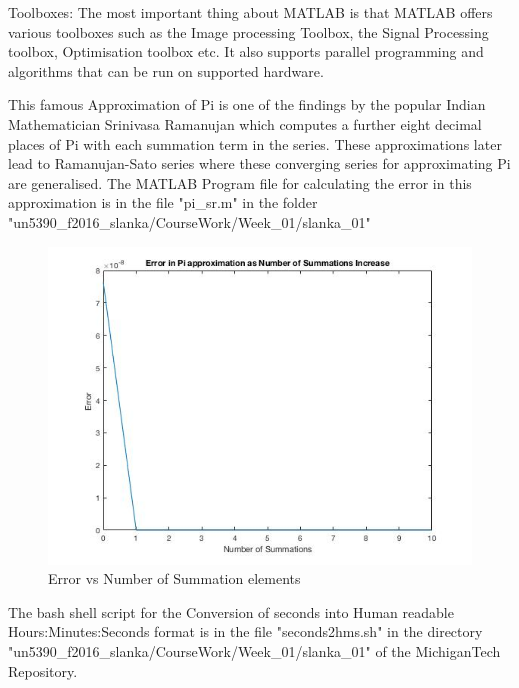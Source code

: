 \documentclass[fleqn,letterpaper,12pt]{report}
\begin{document}
Toolboxes:\newline
The most important thing about MATLAB is that MATLAB offers various toolboxes such as the Image processing Toolbox, the Signal Processing toolbox, Optimisation toolbox etc. It also supports parallel programming and algorithms that can be run on supported hardware.

\vfill

%
\newpage
{}
{}
\problem
This famous Approximation of Pi is one of the findings by the popular Indian Mathematician Srinivasa Ramanujan which computes a further eight decimal places of Pi with each summation term in the series. These approximations later lead to Ramanujan-Sato series where these converging series for approximating Pi are generalised.\newline
The MATLAB Program file for calculating the error in this approximation is in the file "pi\_sr.m" in the folder "un5390\_f2016\_slanka/CourseWork/Week\_01/slanka\_01"\cite{Pi} 
\begin{figure}[ht!]
\centering
\includegraphics[width=140mm]{Pi_sr.jpg}
\caption{Error vs Number of Summation elements\label{overflow}}
\end{figure}


\vfill

%
\newpage
{}
{}
\problem
The bash shell script for the Conversion of seconds into Human readable 
Hours:Minutes:Seconds format is in the file "seconds2hms.sh" in the directory "un5390\_f2016\_slanka/CourseWork/Week\_01/slanka\_01" of the MichiganTech Repository.\cite{tc}
\vfill
\newpage
\end{document}
